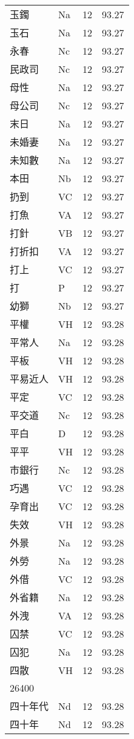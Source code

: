 \documentclass[twocolumn]{book}
\begin{document}
\begin{supertabular}{llrr}
玉鐲 & Na & 12 &  93.27\\
玉石 & Na & 12 &  93.27\\
永春 & Nc & 12 &  93.27\\
民政司 & Nc & 12 &  93.27\\
母性 & Na & 12 &  93.27\\
母公司 & Nc & 12 &  93.27\\
末日 & Na & 12 &  93.27\\
未婚妻 & Na & 12 &  93.27\\
未知數 & Na & 12 &  93.27\\
本田 & Nb & 12 &  93.27\\
扔到 & VC & 12 &  93.27\\
打魚 & VA & 12 &  93.27\\
打針 & VB & 12 &  93.27\\
打折扣 & VA & 12 &  93.27\\
打上 & VC & 12 &  93.27\\
打 & P & 12 &  93.27\\
幼獅 & Nb & 12 &  93.27\\
平權 & VH & 12 &  93.28\\
平常人 & Na & 12 &  93.28\\
平板 & VH & 12 &  93.28\\
平易近人 & VH & 12 &  93.28\\
平定 & VC & 12 &  93.28\\
平交道 & Nc & 12 &  93.28\\
平白 & D & 12 &  93.28\\
平平 & VH & 12 &  93.28\\
市銀行 & Nc & 12 &  93.28\\
巧遇 & VC & 12 &  93.28\\
孕育出 & VC & 12 &  93.28\\
失效 & VH & 12 &  93.28\\
外景 & Na & 12 &  93.28\\
外勞 & Na & 12 &  93.28\\
外借 & VC & 12 &  93.28\\
外省籍 & Na & 12 &  93.28\\
外洩 & VA & 12 &  93.28\\
囚禁 & VC & 12 &  93.28\\
囚犯 & Na & 12 &  93.28\\
四散 & VH & 12 &  93.28\\
26400\\
四十年代 & Nd & 12 &  93.28\\
四十年 & Nd & 12 &  93.28\\

\end{supertabular}
\end{document}
